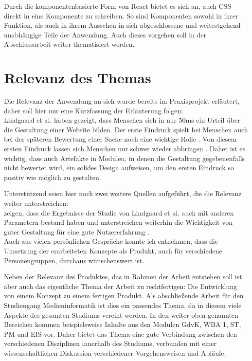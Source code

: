Durch die komponentenbasierte Form von React bietet es sich an, auch CSS direkt in eine Komponente zu schreiben. So sind Komponenten sowohl in ihrer Funktion, als auch in ihrem Aussehen in sich abgeschlossene und weitestgehend unabhängige Teile der Anwendung. Auch dieses vorgehen soll in der Abschlussarbeit weiter thematisiert werden.

\section{Relevanz des Themas}
Die Relevanz der Anwendung an sich wurde bereits im Praxisprojekt erläutert, daher soll hier nur eine Kurzfassung der Erläuterung folgen:\\
Lindgaard et al. \cite{lindgaard2006attention} haben gezeigt, dass Menschen sich in nur 50ms ein Urteil über die Gestaltung einer Website bilden. Der erste Eindruck spielt bei Menschen auch bei der späteren Bewertung einer Sache noch eine wichtige Rolle \cite{campbell1996fitting}. Von diesem ersten Eindruck lassen sich Menschen nur schwer wieder abbringen \cite{nickerson1998confirmation}.
Daher ist es wichtig, dass auch Artefakte in Modulen, in denen die Gestaltung gegebenenfalls nicht bewertet wird, ein solides Design aufweisen, um den ersten Eindruck so positiv wie möglich zu gestalten.

Unterstützend seien hier noch zwei weitere Quellen aufgeführt, die die Relevanz weiter unterstreichen:\\
\cite{tractinsky2006evaluating} zeigen, dass die Ergebnisse der Studie von Lindgaard et al. auch mit anderen Parametern bestand haben und unterstreichen weiterhin die Wichtigkeit von guter Gestaltung für eine gute Nutzererfahrung \cite{tractinsky2000beautiful}.\\
Auch aus vielen persönlichen Gespräche konnte ich entnehmen, dass die Umsetzung der erarbeiteten Konzepte als Produkt, auch für verschiedene Personengruppen, durchaus wünschenswert ist.

Neben der Relevanz des Produktes, das in Rahmen der Arbeit entstehen soll ist aber auch das eigentliche Thema der Arbeit zu rechtfertigen: Die Entwicklung von einem Konzept zu einem fertigen Produkt.
Als abschließende Arbeit für den Studiengang Medieninformatik ist dies ein passendes Thema, da in diesem viele Aspekte des gesamten Studiums vereint werden. In den weiter oben genannten Bereichen kommen beispielsweise Inhalte aus den Modulen GdvK, WBA 1, ST,  PM und EIS vor. Daher bietet das Thema eine gute Verbindung zwischen den verschiedenen Disziplinen innerhalb des Studiums, verbunden mit einer wissenschaftlichen Diskussion verschiedener Vorgehensweisen und Abläufe.

